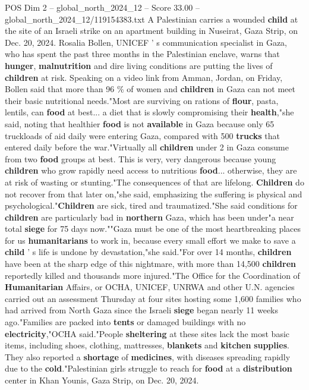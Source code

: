 \begin{textsample}{POS Dim 2 – global\_north\_2024\_12 – Score 33.00 – global\_north\_2024\_12/119154383.txt}
A Palestinian carries a wounded \textbf{child} at the site of an Israeli strike on an apartment building in Nuseirat, Gaza Strip, on Dec. 20, 2024.
Rosalia Bollen, UNICEF ' s communication specialist in Gaza, who has spent the past three months in the Palestinian enclave, warns that \textbf{hunger}, \textbf{malnutrition} and dire living conditions are putting the lives of \textbf{children} at risk.
Speaking on a video link from Amman, Jordan, on Friday, Bollen said that more than 96 \% of women and \textbf{children} in Gaza can not meet their basic nutritional needs."Most are surviving on rations of \textbf{flour}, pasta, lentils, can \textbf{food} at best... a diet that is slowly compromising their \textbf{health},"she said, noting that healthier \textbf{food} is not \textbf{available} in Gaza because only 65 truckloads of aid daily were entering Gaza, compared with 500 \textbf{trucks} that entered daily before the war."Virtually all \textbf{children} under 2 in Gaza consume from two \textbf{food} groups at best.
This is very, very dangerous because young \textbf{children} who grow rapidly need access to nutritious \textbf{food}... otherwise, they are at risk of wasting or stunting."The consequences of that are lifelong. \textbf{Children} do not recover from that later on,"she said, emphasizing the suffering is physical and psychological."\textbf{Children} are sick, tired and traumatized."She said conditions for \textbf{children} are particularly bad in \textbf{northern} Gaza, which has been under"a near total \textbf{siege} for 75 days now.""Gaza must be one of the most heartbreaking places for us \textbf{humanitarians} to work in, because every small effort we make to save a \textbf{child} ' s life is undone by devastation,"she said."For over 14 months, \textbf{children} have been at the sharp edge of this nightmare, with more than 14,500 \textbf{children} reportedly killed and thousands more injured."The Office for the Coordination of \textbf{Humanitarian} Affairs, or OCHA, UNICEF, UNRWA and other U.N. agencies carried out an assessment Thursday at four sites hosting some 1,600 families who had arrived from North Gaza since the Israeli \textbf{siege} began nearly 11 weeks ago."Families are packed into \textbf{tents} or damaged buildings with no \textbf{electricity},"OCHA said."People \textbf{sheltering} at these sites lack the most basic items, including shoes, clothing, mattresses, \textbf{blankets} and \textbf{kitchen} \textbf{supplies}.
They also reported a \textbf{shortage} of \textbf{medicines}, with diseases spreading rapidly due to the \textbf{cold}."Palestinian girls struggle to reach for \textbf{food} at a \textbf{distribution} center in Khan Younis, Gaza Strip, on Dec. 20, 2024.

\end{textsample}
